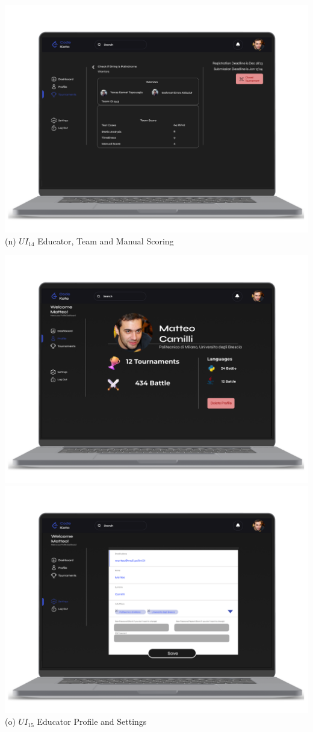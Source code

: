 \begin{center}
\includegraphics[scale=0.13]{Images/ui-ux/educator_team_4 (1).png}
        (n) $UI_{14}$  Educator, Team and Manual Scoring
\end{center}
\begin{center}
\includegraphics[scale=0.13]{Images/ui-ux/educator_profile.png}
\includegraphics[scale=0.13]{Images/ui-ux/educator_settings.png}
        (o) $UI_{15}$  Educator Profile and Settings
\end{center}

